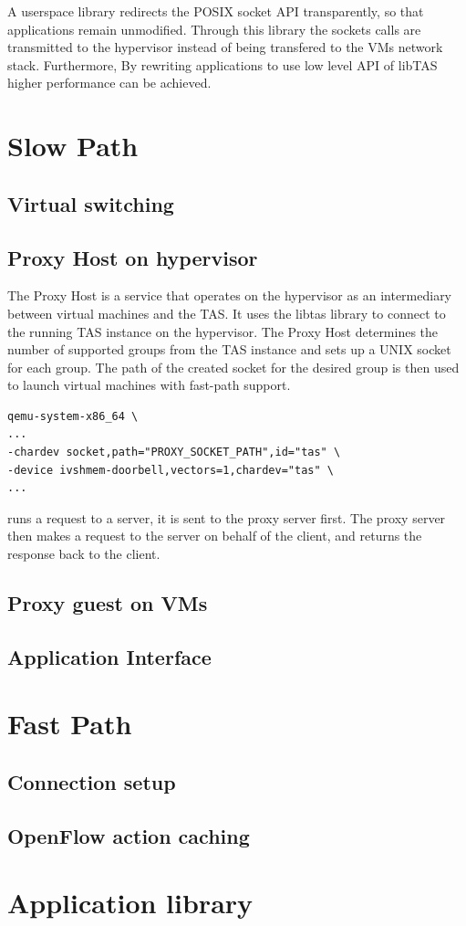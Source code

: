 

A userspace library redirects the POSIX socket API transparently, so that applications 
remain unmodified. Through this library the sockets calls are transmitted to the 
hypervisor instead of being transfered to the VMs network stack. Furthermore, 
By rewriting applications to use low level API of libTAS higher performance can be achieved.

\section{Slow Path}
\subsection{Virtual switching}
\subsection{Proxy Host on hypervisor}

The Proxy Host is a service that operates on the hypervisor as an intermediary between virtual 
machines and the TAS. It uses the libtas library to connect to the running TAS instance on 
the hypervisor. The Proxy Host determines the number of supported groups from the TAS instance 
and sets up a UNIX socket for each group. The path of the created socket for the desired group 
is then used to launch virtual machines with fast-path support.
\begin{lstlisting}[caption={QEMU system x86-64 command with ivshmem-doorbell and socket interface for connection to proxy host},captionpos=b]
qemu-system-x86_64 \
...
-chardev socket,path="PROXY_SOCKET_PATH",id="tas" \
-device ivshmem-doorbell,vectors=1,chardev="tas" \ 
...
\end{lstlisting}

runs a request to a server, it is sent to the proxy server first. The proxy server then makes a request to the server on behalf of the client, and returns the response back to the client.
\subsection{Proxy guest on VMs}
\subsection{Application Interface}

\section{Fast Path}
\subsection{Connection setup}
\subsection{OpenFlow action caching}

\section{Application library}